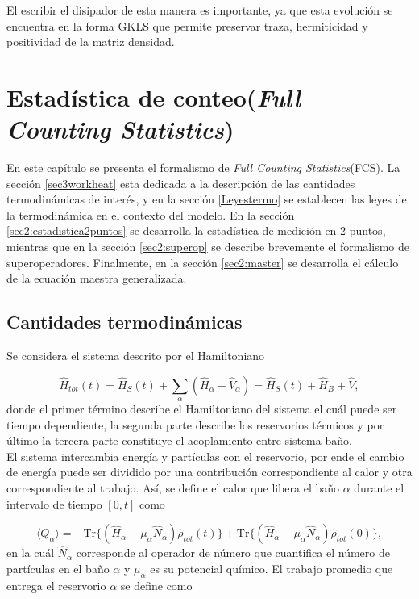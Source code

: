 El escribir el disipador de esta manera es importante, ya que esta evolución se encuentra en la forma GKLS que permite preservar traza, hermiticidad y positividad de la matriz densidad\cite{manzano2020short}. 

\label{sec:lindblad}


\chapter{Estadística de conteo(\textit{Full Counting Statistics}) }
En este capítulo se presenta el formalismo de \textit{Full Counting Statistics}(FCS). La sección \ref{sec3workheat} esta dedicada a la  descripción de las cantidades termodinámicas de interés, y en la sección \ref{Leyestermo} se establecen las leyes de la termodinámica en el contexto del modelo. En la sección \ref{sec2:estadistica2puntos} se desarrolla la estadística de medición en 2 puntos, mientras que en la sección \ref{sec2:superop} se describe brevemente el formalismo de superoperadores. Finalmente, en la sección \ref{sec2:master} se desarrolla el cálculo de la ecuación maestra generalizada. 

\section{Cantidades termodinámicas}
Se considera el sistema descrito por el Hamiltoniano

\begin{equation*}
    \hat{H}_{tot}(t) = \hat{H}_{S}(t) + \sum_{\alpha}(\hat{H}_{\alpha} + \hat{V}_{\alpha})  = \hat{H}_{S}(t) + \hat{H}_{B} + \hat{V},
\end{equation*}
donde el primer término describe el Hamiltoniano del sistema el cuál puede ser tiempo dependiente, la segunda parte describe los reservorios térmicos y por último la tercera parte constituye el acoplamiento entre sistema-baño.\\
El sistema intercambia energía y partículas con el reservorio, por ende el cambio de energía puede ser dividido por una contribución correspondiente al calor y otra correspondiente al trabajo. Así, se define el calor que libera el baño $\alpha$ durante el intervalo de tiempo $[0,t]$ como

\begin{equation}
    \langle Q_{\alpha}\rangle = - \text{Tr}\{(\hat{H}_{\alpha} - \mu_{\alpha}\hat{N}_{\alpha})\hat{\rho}_{tot}(t) \} + \text{Tr}\{(\hat{H}_{\alpha} - \mu_{\alpha}\hat{N}_{\alpha})\hat{\rho}_{tot}(0) \},
\label{sec3:calor}
\end{equation}
en la cuál $\hat{N}_{\alpha}$ corresponde al operador de número que cuantifica el número de partículas en el baño $\alpha$ y $\mu_{\alpha}$ es su potencial químico. El trabajo promedio que entrega el reservorio $\alpha$ se define como

